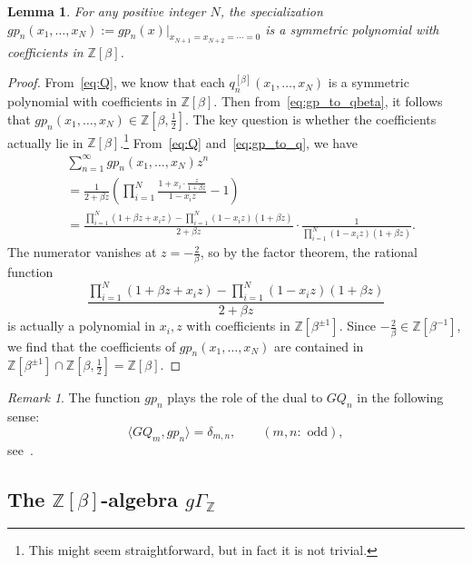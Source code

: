 \documentclass[dvipdfmx]{amsart}
\newtheorem{lemma}[thm]{Lemma}
\theoremstyle{definition}
\theoremstyle{remark}
\newtheorem*{remark}{Remark}%
\begin{document}
\begin{lemma}
For any positive integer \( N \), the specialization \( gp_n(x_1, \dots, x_N) := gp_n(x)|_{x_{N+1} = x_{N+2} = \cdots = 0} \) is a symmetric polynomial with coefficients in \( \mathbb{Z}[\beta] \).
\end{lemma}

\begin{proof}
From~\eqref{eq:Q}, we know that each \( q_n^{[\beta]}(x_1, \dots, x_N) \) is a symmetric polynomial with coefficients in \( \mathbb{Z}[\beta] \).  
Then from~\eqref{eq:gp_to_qbeta}, it follows that \( gp_n(x_1, \dots, x_N) \in \mathbb{Z}[\beta, \tfrac{1}{2}] \).  
The key question is whether the coefficients actually lie in \( \mathbb{Z}[\beta] \).\footnote{This might seem straightforward, but in fact it is not trivial.}
From~\eqref{eq:Q} and~\eqref{eq:gp_to_q}, we have
\[
\begin{aligned}
&\sum_{n=1}^\infty gp_n(x_1, \dots, x_N) z^n\\
&= \frac{1}{2 + \beta z} \left( 
\prod_{i=1}^N \frac{1 + x_i \cdot \frac{z}{1 + \beta z}}{1 - x_i z} - 1 
\right) \\
&= 
\frac{ 
\prod_{i=1}^N (1 + \beta z + x_i z) 
- \prod_{i=1}^N (1 - x_i z)(1 + \beta z) 
}{2 + \beta z} \cdot 
\frac{1}{\prod_{i=1}^N (1 - x_i z)(1 + \beta z)}.
\end{aligned}
\]
The numerator vanishes at \( z = -\frac{2}{\beta} \), so by the factor theorem, the rational function
\[
\frac{ 
\prod_{i=1}^N (1 + \beta z + x_i z) 
- \prod_{i=1}^N (1 - x_i z)(1 + \beta z)
}{2 + \beta z}
\]
is actually a polynomial in \( x_i, z \) with coefficients in \( \mathbb{Z}[\beta^{\pm 1}] \).  
Since \( -\frac{2}{\beta} \in \mathbb{Z}[\beta^{-1}] \), we find that the coefficients of \( gp_n(x_1, \dots, x_N) \) are contained in \( \mathbb{Z}[\beta^{\pm 1}] \cap \mathbb{Z}[\beta, \tfrac{1}{2}] = \mathbb{Z}[\beta] \).
\end{proof}

\begin{remark}
The function \( gp_n \) plays the role of the dual to \( GQ_n \) in the following sense:
\[
\langle GQ_m, gp_n \rangle = \delta_{m,n}, \qquad (m, n: \text{ odd}),
\]
see~\cite[Equation (35)]{iwao2023}.
\end{remark}

\subsection{The \( \mathbb{Z}[\beta] \)-algebra \( g\Gamma_{\mathbb{Z}} \)}
\end{document}

